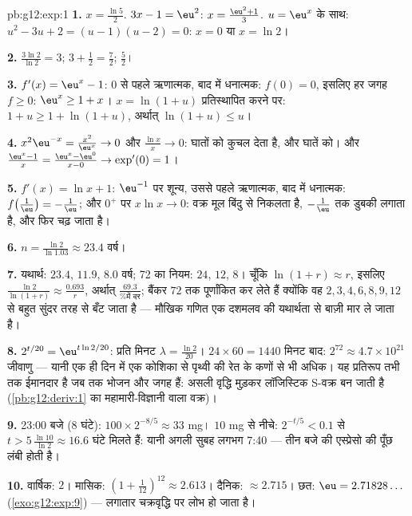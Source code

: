 \begin{solution}{pb:g12:exp:1}
\textbf{1.} $x = \frac{\ln 5}{2}$. \quad $3x - 1 = \eu^2$: $x = \frac{\eu^2 + 1}{3}$. \quad $u = \eu^x$ के साथ: $u^2 - 3u + 2 = (u - 1)(u - 2) = 0$: $x = 0$ या
$x = \ln 2$।

\textbf{2.} $\frac{3\ln 2}{\ln 2} = 3$; \quad $3 + \frac12 = \frac72$; \quad $\frac52$।

\textbf{3.} $f'(x) = \eu^x - 1$: $0$ से पहले ऋणात्मक, बाद में धनात्मक:  $f(0) = 0$,
इसलिए हर जगह $f \geq 0$: $\eu^x \geq 1 + x$। $x = \ln(1 + u)$ प्रतिस्थापित करने पर: $1 + u \geq 1 + \ln(1 + u)$, अर्थात् $\ln(1 + u) \leq u$।

\textbf{4.} $x^2\eu^{-x} = \frac{x^2}{\eu^x} \to 0$ और $\frac{\ln x}{x} \to 0$:  घातों को कुचल देता है, और घातें
 को। और $\frac{\eu^x - 1}{x} =
\frac{\eu^x - \eu^0}{x - 0} \to \exp'(0) = 1$।

\textbf{5.} $f'(x) = \ln x + 1$: $\eu^{-1}$ पर शून्य, उससे पहले ऋणात्मक, बाद में धनात्मक:
 $f\!\left(\frac1\eu\right) = -\frac1\eu$; और $0^+$ पर $x \ln x \to 0$: वक्र मूल बिंदु से निकलता है, $-\frac1\eu$ तक
डुबकी लगाता है, और फिर चढ़ जाता है।

\textbf{6.} $n = \frac{\ln 2}{\ln 1.03} \approx 23.4$ वर्ष।

\textbf{7.} यथार्थ: $23.4$, $11.9$, $8.0$ वर्ष; 72 का नियम: $24$, $12$,
$8$। चूँकि $\ln(1+r) \approx r$, इसलिए $\frac{\ln 2}{\ln(1+r)} \approx \frac{0.693}{r}$, अर्थात् $\frac{69.3}{\text{\% में दर}}$; बैंकर $72$ तक पूर्णांकित कर
लेते हैं क्योंकि वह $2, 3, 4, 6, 8, 9, 12$ से बहुत सुंदर तरह से बँट जाता है --- मौखिक गणित एक
दशमलव की यथार्थता से बाज़ी मार ले जाता है।

\textbf{8.} $2^{t/20} = \eu^{t \ln 2 / 20}$: प्रति मिनट $\lambda = \frac{\ln 2}{20}$। $24 \times 60 = 1440$ मिनट बाद: $2^{72} \approx 4.7 \times
10^{21}$ जीवाणु --- यानी
एक ही दिन में एक कोशिका से पृथ्वी की रेत के कणों से भी अधिक। यह प्रतिरूप तभी
तक ईमानदार है जब तक भोजन और जगह हैं: असली वृद्धि मुड़कर लॉजिस्टिक S-वक्र बन
जाती है (\cref{pb:g12:deriv:1} का महामारी-विज्ञानी वाला वक्र)।

\textbf{9.} 23:00 बजे ($8$ घंटे): $100 \times 2^{-8/5} \approx 33$ mg। $10$ mg से नीचे: $2^{-t/5} < 0.1$ से
$t > 5\,\frac{\ln 10}{\ln 2} \approx
16.6$ घंटे मिलते हैं: यानी अगली सुबह लगभग 7:40 --- तीन बजे की एस्प्रेसो की
पूँछ लंबी होती है।

\textbf{10.} वार्षिक: $2$। मासिक: $\left(1 + \frac{1}{12}\right)^{12} \approx 2.613$। दैनिक: $\approx 2.715$। छत: $\eu = 2.71828\ldots$ (\cref{exo:g12:exp:9})
--- लगातार चक्रवृद्धि पर लोभ  हो जाता है।


\end{solution}
